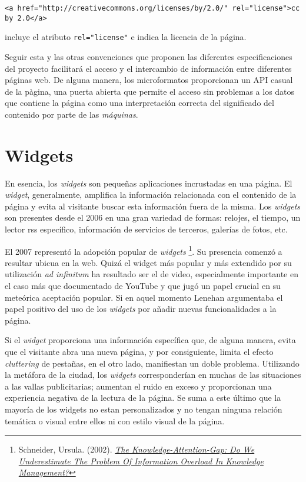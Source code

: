 \documentclass[12pt, a4paper,twoside]{book}
\begin{document}
\begin{verbatim}
<a href="http://creativecommons.org/licenses/by/2.0/" rel="license">cc by 2.0</a>
\end{verbatim}
incluye el atributo \verb!rel="license"! e indica la licencia de la
página.

Seguir esta y las otras convenciones que proponen las diferentes
especificaciones del proyecto facilitará el acceso y el intercambio
de información entre diferentes páginas web. De alguna manera, los
microformatos proporcionan un API casual de la pàgina, una puerta
abierta que permite el acceso sin problemas a los datos que
contiene la página como una interpretación correcta del significado
del contenido por parte de las \emph{máquinas}.

\section{Widgets}

En esencia, los \emph{widgets} son pequeñas aplicaciones
incrustadas en una página. El \emph{widget}, generalmente,
amplifica la información relacionada con el contenido de la página
y evita al visitante buscar esta información fuera de la misma. Los
\emph{widgets} son presentes desde el 2006 en una gran variedad de
formas: relojes, el tiempo, un lector rss específico, información
de servicios de terceros, galerías de fotos, etc.

El 2007 representó la adopción popular de \emph{widgets}%
\footnote{Schneider, Ursula. (2002).
\emph{\href{http://www.jucs.org/jucs_8_5/the_knowledge_attention_gap/Schneider_U.html}{The Knowledge-Attention-Gap: Do We Underestimate The Problem Of Information Overload In Knowledge Management?}}}.
Su presencia comenzó a resultar ubicua en la web. Quizá el widget
más popular y más extendido por su utilización \emph{ad infinitum}
ha resultado ser el de video, especialmente importante en el caso
más que documentado de YouTube y que jugó un papel crucial en su
meteórica aceptación popular. Si en aquel momento Lenehan
argumentaba el papel positivo del uso de los \emph{widgets} por
añadir nuevas funcionalidades a la página.

Si el \emph{widget} proporciona una información específica que, de
alguna manera, evita que el visitante abra una nueva página, y por
consiguiente, limita el efecto \emph{cluttering} de pestañas, en el
otro lado, manifiestan un doble problema. Utilizando la metáfora de
la ciudad, los \emph{widgets} corresponderían en muchas de las
situaciones a las vallas publicitarias; aumentan el ruido en exceso
y proporcionan una experiencia negativa de la lectura de la página.
Se suma a este último que la mayoría de los widgets no estan
personalizados y no tengan ninguna relación temática o visual entre
ellos ni con estilo visual de la página.
\end{document}
